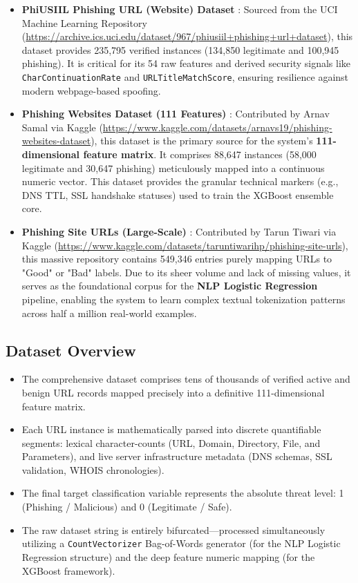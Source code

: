 \begin{itemize}
    \item \textbf{PhiUSIIL Phishing URL (Website) Dataset} \cite{ref5}:
    Sourced from the UCI Machine Learning Repository (\url{https://archive.ics.uci.edu/dataset/967/phiusiil+phishing+url+dataset}), this dataset provides 235,795 verified instances (134,850 legitimate and 100,945 phishing). It is critical for its 54 raw features and derived security signals like \texttt{CharContinuationRate} and \texttt{URLTitleMatchScore}, ensuring resilience against modern webpage-based spoofing.

    \item \textbf{Phishing Websites Dataset (111 Features)} \cite{ref23}:
    Contributed by Arnav Samal via Kaggle (\url{https://www.kaggle.com/datasets/arnavs19/phishing-websites-dataset}), this dataset is the primary source for the system's \textbf{111-dimensional feature matrix}. It comprises 88,647 instances (58,000 legitimate and 30,647 phishing) meticulously mapped into a continuous numeric vector. This dataset provides the granular technical markers (e.g., DNS TTL, SSL handshake statuses) used to train the XGBoost ensemble core.

    \item \textbf{Phishing Site URLs (Large-Scale)} \cite{ref24}:
    Contributed by Tarun Tiwari via Kaggle (\url{https://www.kaggle.com/datasets/taruntiwarihp/phishing-site-urls}), this massive repository contains 549,346 entries purely mapping URLs to "Good" or "Bad" labels. Due to its sheer volume and lack of missing values, it serves as the foundational corpus for the \textbf{NLP Logistic Regression} pipeline, enabling the system to learn complex textual tokenization patterns across half a million real-world examples.
\end{itemize}


\subsection{Dataset Overview}

\begin{itemize}
\item The comprehensive dataset comprises tens of thousands of verified active and benign URL records mapped precisely into a definitive 111-dimensional feature matrix.
\item Each URL instance is mathematically parsed into discrete quantifiable segments: lexical character-counts (URL, Domain, Directory, File, and Parameters), and live server infrastructure metadata (DNS schemas, SSL validation, WHOIS chronologies).
\item The final target classification variable represents the absolute threat level: 1 (Phishing / Malicious) and 0 (Legitimate / Safe).
\item The raw dataset string is entirely bifurcated---processed simultaneously utilizing a \texttt{CountVectorizer} Bag-of-Words generator (for the NLP Logistic Regression structure) and the deep feature numeric mapping (for the XGBoost framework).
\end{itemize}


